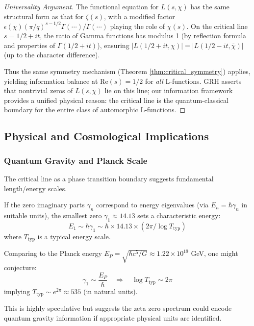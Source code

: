 \documentclass[12pt]{article}
\theoremstyle{plain}
\theoremstyle{definition}
\begin{document}
\begin{proof}[Universality Argument]
The functional equation for $L(s, \chi)$ has the same structural form as that for $\zeta(s)$, with a modified factor $\epsilon(\chi)(\pi/q)^{s-1/2} \Gamma(\cdots) / \Gamma(\cdots)$ playing the role of $\chi(s)$. On the critical line $s = 1/2 + it$, the ratio of Gamma functions has modulus 1 (by reflection formula and properties of $\Gamma(1/2+it)$), ensuring $|L(1/2+it, \chi)| = |L(1/2-it, \bar{\chi})|$ (up to the character difference).

Thus the same symmetry mechanism (Theorem \ref{thm:critical_symmetry}) applies, yielding information balance at $\text{Re}(s) = 1/2$ for \emph{all} L-functions. GRH asserts that nontrivial zeros of $L(s, \chi)$ lie on this line; our information framework provides a unified physical reason: the critical line is the quantum-classical boundary for the entire class of automorphic L-functions.
\end{proof}

\subsection{Physical and Cosmological Implications}

\subsubsection{Quantum Gravity and Planck Scale}

The critical line as a phase transition boundary suggests fundamental length/energy scales.

\begin{speculation}
If the zero imaginary parts $\gamma_n$ correspond to energy eigenvalues (via $E_n = \hbar \gamma_n$ in suitable units), the smallest zero $\gamma_1 \approx 14.13$ sets a characteristic energy:
$$E_1 \sim \hbar \gamma_1 \sim \hbar \times 14.13 \times (2\pi / \log T_{\text{typ}})$$
where $T_{\text{typ}}$ is a typical energy scale.

Comparing to the Planck energy $E_P = \sqrt{\hbar c^5 / G} \approx 1.22 \times 10^{19}$ GeV, one might conjecture:
$$\gamma_1 \sim \frac{E_P}{\hbar} \quad \Rightarrow \quad \log T_{\text{typ}} \sim 2\pi$$
implying $T_{\text{typ}} \sim e^{2\pi} \approx 535$ (in natural units).

This is highly speculative but suggests the zeta zero spectrum could encode quantum gravity information if appropriate physical units are identified.
\end{speculation}
\end{document}

